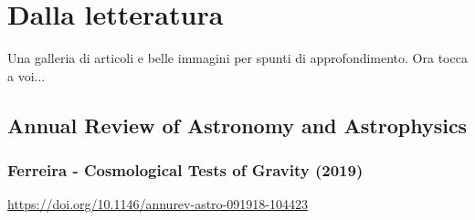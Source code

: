 \chapter{Dalla letteratura}\label{last:ch}

Una galleria di articoli e belle immagini per spunti di approfondimento. Ora tocca a voi...




\section{Annual Review of Astronomy and Astrophysics}
\subsection*{Ferreira - Cosmological Tests of Gravity (2019)}
\url{https://doi.org/10.1146/annurev-astro-091918-104423}

